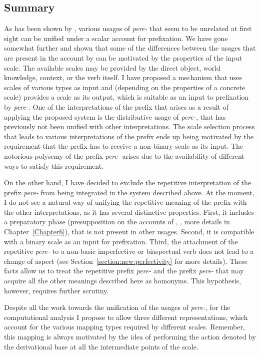 \subsection{Summary}
As has been shown by \citet{Kagan:book}, various usages of \textit{pere-} that seem to be unrelated at first sight can be unified under a scalar account for prefixation. We have gone somewhat further and shown that some of the differences between the usages that are present in the account by \citet{Kagan:book} can be motivated by the properties of the input scale. The available scales may be provided by the direct object, world knowledge, context, or the verb itself. I have proposed a mechanism that uses scales of various types as input and (depending on the properties of a concrete scale) provides a scale as its output, which is suitable as an input to prefixation by \textit{pere-}. One of the interpretations of the prefix that arises as a result of applying the proposed system is the distributive usage of \textit{pere-}, that has previously not been unified with other interpretations. The scale selection process that leads to various interpretations of the prefix ends up being motivated by the requirement that the prefix has to receive a non-binary scale as its input. The notorious polysemy of the prefix \textit{pere-} arises due to the availability of different ways to satisfy this requirement. 

On the other hand, I have decided to exclude the repetitive interpretation of the prefix \textit{pere-} from being integrated in the system described above. At the moment, I do not see a natural way of unifying the repetitive meaning of the prefix with the other interpretations, as it has several distinctive properties. First, it includes a preparatory phase (presupposition on the accounts of \citealt{Demjjanow:97}, \citealt{Kagan:book}, more details in Chapter~\ref{Chapter6}), that is not present in other usages. Second, it is compatible with a binary scale as an input for prefixation. Third, the attachment of the repetitive \textit{pere-} to a non-basic imperfective or biaspectual verb does not lead to a change of aspect (see Section~\ref{section:new:perfectivity} for more details). These facts allow us to treat the repetitive prefix \textit{pere-} and the prefix \textit{pere-} that may acquire all the other meanings described here as homonyms. This hypothesis, however, requires further scrutiny.

Despite all the work towards the unification of the usages of \textit{pere-}, for the computational analysis I propose to allow three different representations, which account for the various mapping types required by different scales. Remember, this mapping is always motivated by the idea of performing the action denoted by the derivational base at all the intermediate points of the scale. 

